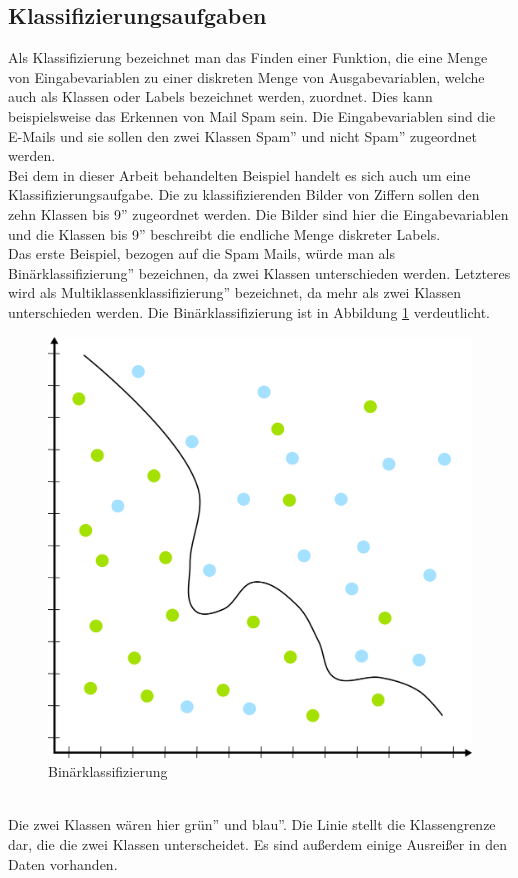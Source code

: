 \documentclass[11pt]{article}
\begin{document}
\subsection{Klassifizierungsaufgaben}
Als Klassifizierung bezeichnet man das Finden einer Funktion, die eine Menge von Eingabevariablen zu einer diskreten Menge von Ausgabevariablen, welche auch als Klassen oder Labels bezeichnet werden, zuordnet. Dies kann beispielsweise das Erkennen von Mail Spam sein. Die Eingabevariablen sind die E-Mails und sie sollen den zwei Klassen \glqq Spam'' und \glqq nicht Spam'' zugeordnet werden.\\
Bei dem in dieser Arbeit behandelten Beispiel handelt es sich auch um eine Klassifizierungsaufgabe. Die zu klassifizierenden Bilder von Ziffern sollen den zehn Klassen  bis 9'' zugeordnet werden. Die Bilder sind hier die Eingabevariablen und die Klassen  bis 9'' beschreibt die endliche Menge diskreter Labels.\\
Das erste Beispiel, bezogen auf die Spam Mails, würde man als \glqq Binärklassifizierung'' bezeichnen, da zwei Klassen unterschieden werden. Letzteres wird als \glqq Multiklassenklassifizierung'' bezeichnet, da mehr als zwei Klassen unterschieden werden. Die Binärklassifizierung ist in Abbildung \ref{Classification} verdeutlicht.
\begin{figure}[h]
	\centering
	\includegraphics[width=0.4\linewidth]{../graphics/Classification.png}
	\caption{Binärklassifizierung}
	\label{Classification}
\end{figure}
\\
Die zwei Klassen wären hier \glqq grün'' und \glqq blau''. Die Linie stellt die Klassengrenze dar, die die zwei Klassen unterscheidet. Es sind außerdem einige Ausreißer in den Daten vorhanden. 
\end{document}
